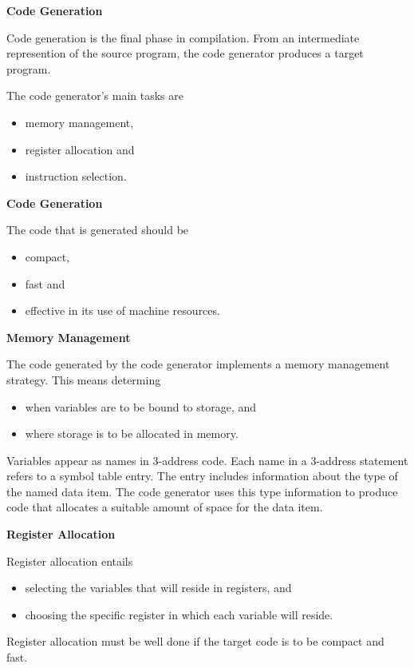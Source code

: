 \setcounter{slide}{95}
%
%
\begin{slide}{}
{\bf Code Generation}

Code generation is the final phase in compilation.
From an intermediate represention of the source program,
the code generator produces a target program.

The code generator's main tasks are
\begin{itemize}
\item memory management,
\item register allocation and
\item instruction selection.
\end{itemize}
\end{slide}
%
%
\begin{slide}{}
{\bf Code Generation}

The code that is generated should be                              
\begin{itemize}
\item compact,
\item fast and
\item effective in its use of machine resources.
\end{itemize}
\end{slide}
%
%
\begin{slide}{}
{\bf Memory Management}

The code generated by the code generator implements a
memory management strategy.  This means determing
\begin{itemize}
\item when variables are to be bound to storage, and
\item where storage is to be allocated in memory.
\end{itemize}

Variables appear as names in 3-address code. Each name
in a 3-address statement refers to a symbol table entry.
The entry includes information about the type of the named
data item.  The code generator uses this type information
to produce code that allocates a suitable amount of space
for the data item.
\end{slide}
%
%
\begin{slide}{}
{\bf Register Allocation}

Register allocation entails
\begin{itemize}
\item selecting the variables that will reside in registers, and
\item choosing the specific register in which each variable
      will reside.
\end{itemize}

Register allocation must be well done if the target code is to
be compact and fast.
\end{slide}
